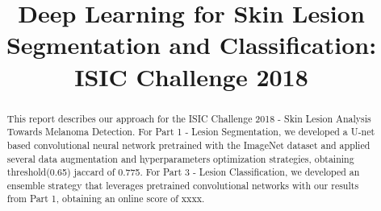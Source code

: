 \documentclass[conference]{IEEEtran}
\begin{document}
\title{Deep Learning for Skin Lesion Segmentation and Classification: ISIC Challenge 2018}

\author{}

\author{
}

\maketitle

%
%
%
%
%
%
%
%




\begin{abstract}
This report describes our approach for the ISIC Challenge 2018 - Skin Lesion Analysis Towards Melanoma Detection. For Part 1 - Lesion Segmentation, we developed a U-net based convolutional neural network pretrained with the ImageNet dataset\cite{imagenet} and applied several data augmentation and hyperparameters optimization strategies, obtaining threshold(0.65) jaccard of 0.775. For Part 3 - Lesion Classification, we developed an ensemble strategy that leverages pretrained convolutional networks with our results from Part 1, obtaining an online score of xxxx. 
\end{abstract}
\end{document}
